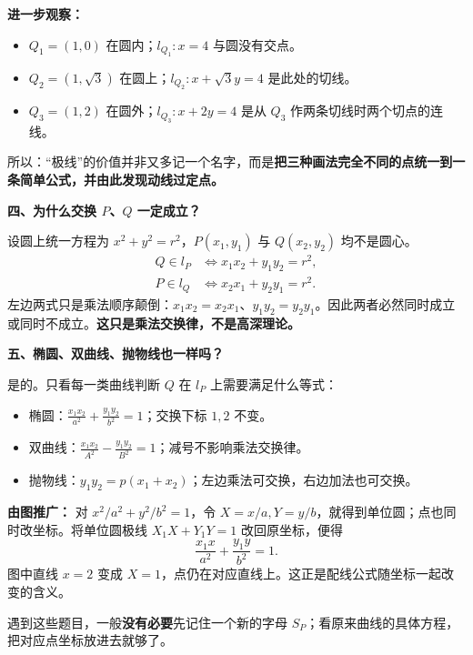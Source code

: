\begin{explanationbox}
\textbf{进一步观察：}
\begin{itemize}[leftmargin=*,itemsep=0.38em]
\item $Q_1=(1,0)$ 在圆内；$l_{Q_1}:x=4$ 与圆没有交点。
\item $Q_2=(1,\sqrt3)$ 在圆上；$l_{Q_2}:x+\sqrt3y=4$ 是此处的切线。
\item $Q_3=(1,2)$ 在圆外；$l_{Q_3}:x+2y=4$ 是从 $Q_3$ 作两条切线时两个切点的连线。
\end{itemize}
所以：“极线”的价值并非又多记一个名字，而是\textbf{把三种画法完全不同的点统一到一条简单公式，并由此发现动线过定点。}

\medskip
\textbf{\textcolor{CExplanation}{四、为什么交换 $P$、$Q$ 一定成立？}}

设圆上统一方程为 $x^2+y^2=r^2$，$P(x_1,y_1)$ 与 $Q(x_2,y_2)$ 均不是圆心。
\[
\begin{aligned}
Q\in l_P &\iff x_1x_2+y_1y_2=r^2,\\
P\in l_Q &\iff x_2x_1+y_2y_1=r^2.
\end{aligned}
\]
左边两式只是乘法顺序颠倒：$x_1x_2=x_2x_1$、$y_1y_2=y_2y_1$。因此两者必然同时成立或同时不成立。\textbf{这只是乘法交换律，不是高深理论。}

\medskip
\textbf{\textcolor{CExplanation}{五、椭圆、双曲线、抛物线也一样吗？}}

是的。只看每一类曲线判断 $Q$ 在 $l_P$ 上需要满足什么等式：
\begin{itemize}[leftmargin=*,itemsep=0.4em]
\item 椭圆：$\displaystyle \frac{x_1x_2}{a^2}+\frac{y_1y_2}{b^2}=1$；交换下标 $1,2$ 不变。
\item 双曲线：$\displaystyle \frac{x_1x_2}{A^2}-\frac{y_1y_2}{B^2}=1$；减号不影响乘法交换律。
\item 抛物线：$\displaystyle y_1y_2=p(x_1+x_2)$；左边乘法可交换，右边加法也可交换。
\end{itemize}

\begin{center}

\end{center}
\textbf{由图推广：} 对 $x^2/a^2+y^2/b^2=1$，令 $X=x/a,Y=y/b$，就得到单位圆；点也同时改坐标。将单位圆极线 $X_1X+Y_1Y=1$ 改回原坐标，便得
\[
\boxed{\frac{x_1x}{a^2}+\frac{y_1y}{b^2}=1}.
\]
图中直线 $x=2$ 变成 $X=1$，点仍在对应直线上。这正是配线公式随坐标一起改变的含义。

遇到这些题目，一般\textbf{没有必要}先记住一个新的字母 $S_P$；看原来曲线的具体方程，把对应点坐标放进去就够了。


\end{explanationbox}
